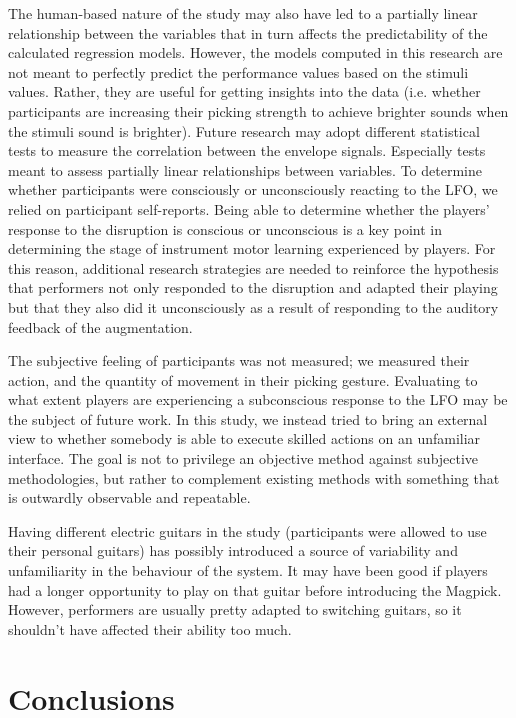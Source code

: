 \documentclass[sigconf]{nimeart}
\begin{document}
The human-based nature of the study may also have led to a partially linear relationship between the variables that in turn affects the predictability of the calculated regression models. However, the models computed in this research are not meant to perfectly predict the performance values based on the stimuli values. Rather, they are useful for getting insights into the data (i.e. whether participants are increasing their picking strength to achieve brighter sounds when the stimuli sound is brighter). Future research may adopt different statistical tests to measure the correlation between the envelope signals. Especially tests meant to assess partially linear relationships between variables. To determine whether participants were consciously or unconsciously reacting to the LFO, we relied on participant self-reports. Being able to determine whether the players' response to the disruption is conscious or unconscious is a key point in determining the stage of instrument motor learning experienced by players. For this reason, additional research strategies are needed to reinforce the hypothesis that performers not only responded to the disruption and adapted their playing but that they also did it unconsciously as a result of responding to the auditory feedback of the augmentation.

The subjective feeling of participants was not measured; we measured their action, and the quantity of movement in their picking gesture. Evaluating to what extent players are experiencing a subconscious response to the LFO may be the subject of future work. In this study, we instead tried to bring an external view to whether somebody is able to execute skilled actions on an unfamiliar interface. The goal is not to privilege an objective method against subjective methodologies, but rather to complement existing methods with something that is outwardly observable and repeatable.

Having different electric guitars in the study (participants were allowed to use their personal guitars) has possibly introduced a source of variability and unfamiliarity in the behaviour of the system. It may have been good if players had a longer opportunity to play on that guitar before introducing the Magpick. However, performers are usually pretty adapted to switching guitars, so it shouldn't have affected their ability too much.

\section{Conclusions}\label{conclusions}
\end{document}
